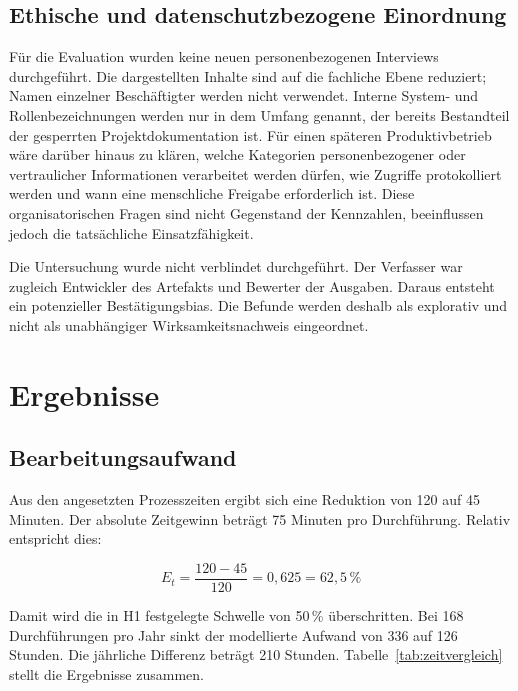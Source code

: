 \documentclass[
  10pt,
  ngerman,
  a4paper,
  toc=graduated,
  numbers=noenddot,
  headings=standardclasses,
  nonumberlist
]{scrartcl}
\newcommand{\pct}[1]{#1\,\%}
\begin{document}
\subsection{Ethische und datenschutzbezogene Einordnung}

Für die Evaluation wurden keine neuen personenbezogenen Interviews durchgeführt. Die dargestellten Inhalte sind auf die fachliche Ebene reduziert; Namen einzelner Beschäftigter werden nicht verwendet. Interne System- und Rollenbezeichnungen werden nur in dem Umfang genannt, der bereits Bestandteil der gesperrten Projektdokumentation ist. Für einen späteren Produktivbetrieb wäre darüber hinaus zu klären, welche Kategorien personenbezogener oder vertraulicher Informationen verarbeitet werden dürfen, wie Zugriffe protokolliert werden und wann eine menschliche Freigabe erforderlich ist. Diese organisatorischen Fragen sind nicht Gegenstand der Kennzahlen, beeinflussen jedoch die tatsächliche Einsatzfähigkeit.

Die Untersuchung wurde nicht verblindet durchgeführt. Der Verfasser war zugleich Entwickler des Artefakts und Bewerter der Ausgaben. Daraus entsteht ein potenzieller Bestätigungsbias. Die Befunde werden deshalb als explorativ und nicht als unabhängiger Wirksamkeitsnachweis eingeordnet.

\section{Ergebnisse}

\subsection{Bearbeitungsaufwand}

Aus den angesetzten Prozesszeiten ergibt sich eine Reduktion von 120 auf 45 Minuten. Der absolute Zeitgewinn beträgt 75 Minuten pro Durchführung. Relativ entspricht dies:

\begin{equation}
E_t = \frac{120-45}{120} = 0{,}625 = \pct{62{,}5}
\end{equation}

Damit wird die in H1 festgelegte Schwelle von \pct{50} überschritten. Bei 168 Durchführungen pro Jahr sinkt der modellierte Aufwand von 336 auf 126 Stunden. Die jährliche Differenz beträgt 210 Stunden. Tabelle~\ref{tab:zeitvergleich} stellt die Ergebnisse zusammen.
\end{document}
